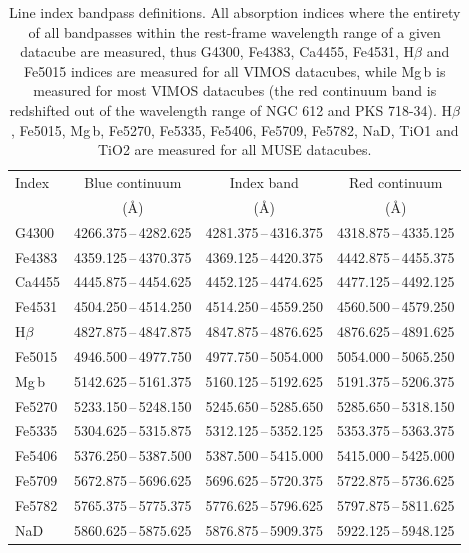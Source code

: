 		 	\begin{table}
				\centering
			\begin{threeparttable}
				\caption{Line index bandpass definitions. All absorption indices where the entirety of all bandpasses within the rest-frame wavelength range of a given datacube are measured, thus G4300, Fe4383, Ca4455, Fe4531, H$\beta$ and Fe5015 indices are measured for all VIMOS datacubes, while Mg\,b is measured for most VIMOS datacubes (the red continuum band is redshifted out of the wavelength range of NGC 612 and PKS 718-34). H$\beta$, Fe5015, Mg\,b, Fe5270, Fe5335, Fe5406, Fe5709, Fe5782, NaD, TiO1 and TiO2 are measured for all MUSE datacubes.}
				\label{tab:abIndex}
				\begin{tabular}{l c c c}
					\hline
					\hline
					Index 	& Blue continuum & Index band & Red continuum \\
					 & (\AA) & (\AA) & (\AA) \\ 
					\hline 
					G4300 	& 4266.375\,--\,4282.625 & 4281.375\,--\,4316.375 & 4318.875\,--\,4335.125 \\
					Fe4383 	& 4359.125\,--\,4370.375 & 4369.125\,--\,4420.375 & 4442.875\,--\,4455.375 \\
					Ca4455 	& 4445.875\,--\,4454.625 & 4452.125\,--\,4474.625 & 4477.125\,--\,4492.125 \\
					Fe4531 	& 4504.250\,--\,4514.250 & 4514.250\,--\,4559.250 & 4560.500\,--\,4579.250 \\
					H$\beta$ & 4827.875\,--\,4847.875 & 4847.875\,--\,4876.625 & 4876.625\,--\,4891.625 \\
					Fe5015 	& 4946.500\,--\,4977.750 & 4977.750\,--\,5054.000 & 5054.000\,--\,5065.250 \\
					Mg\,b 	& 5142.625\,--\,5161.375 & 5160.125\,--\,5192.625 & 5191.375\,--\,5206.375 \\
					Fe5270 	& 5233.150\,--\,5248.150 & 5245.650\,--\,5285.650 & 5285.650\,--\,5318.150 \\
					Fe5335 	& 5304.625\,--\,5315.875 & 5312.125\,--\,5352.125 & 5353.375\,--\,5363.375 \\
					Fe5406 	& 5376.250\,--\,5387.500 & 5387.500\,--\,5415.000 & 5415.000\,--\,5425.000 \\
					Fe5709 	& 5672.875\,--\,5696.625 & 5696.625\,--\,5720.375 & 5722.875\,--\,5736.625 \\
					Fe5782 	& 5765.375\,--\,5775.375 & 5776.625\,--\,5796.625 & 5797.875\,--\,5811.625 \\
					NaD 	& 5860.625\,--\,5875.625 & 5876.875\,--\,5909.375 & 5922.125\,--\,5948.125 \\

\end{tabular}
\end{threeparttable}
\end{table}
